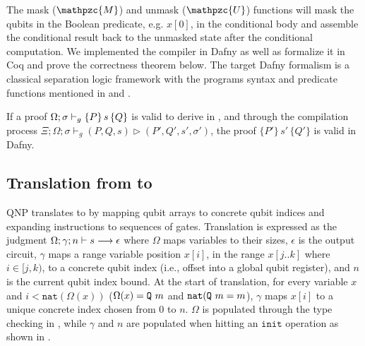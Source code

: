 The mask ($\mathpzc{M}$) and unmask ($\mathpzc{U}$) functions will mask the qubits in the Boolean predicate, e.g. $x[0]$, in the conditional body and assemble the conditional result back to the unmasked state after the conditional computation.
We implemented the compiler in Dafny as well as formalize it in Coq and prove the correctness theorem below. The target Dafny formalism is a classical separation logic framework \cite{separationlogic} with the \qafny programs syntax and predicate functions mentioned in  and .

\begin{theorem}\label{thm:proof-compile-dafny}\rm 
If a proof $\Omega;\sigma\vdash_{g}\{P\}\, s \,\{Q\}$ is valid to derive in \qafny, and through the compilation process $\Xi;\Omega;\sigma\vdash_g (P,Q,s) \triangleright (P',Q',s',\sigma')$, the proof $\{P'\} \, s' \,\{Q'\}$ is valid in Dafny.
\end{theorem}

\subsection{Translation from \qafny to \sqir}\label{sec:vqir-compilation}

\newcommand{\tget}{\texttt{get}}
\newcommand{\tstart}{\texttt{start}}
\newcommand{\tfst}{\texttt{fst}}
\newcommand{\tsnd}{\texttt{snd}}
\newcommand{\tucom}[1]{\texttt{ucom}~{#1}}
\newcommand{\tif}{\texttt{if}}
\newcommand{\tthen}{\texttt{then}}
\newcommand{\telse}{\texttt{else}}
\newcommand{\tlet}{\texttt{let}}
\newcommand{\tin}{\texttt{in}}

QNP translates \qafny to \sqir by mapping \qafny qubit arrays to \sqir concrete qubit indices and expanding \qafny instructions to sequences of \sqir gates.
%
%
Translation is expressed as the judgment
$\Omega;\gamma;n\vdash s \longrightarrow \epsilon$ where $\Omega$ maps \qafny variables to their sizes, 
$\epsilon$ is the output \sqir circuit, $\gamma$ maps a \qafny range variable
position $x[i]$, in the range $x[j..k]$ where $i \in [j,k)$, to a \sqir concrete qubit index (i.e., offset into a 
global qubit register), and $n$ is the current qubit index bound.  
At the start of translation, for every
variable $x$ and $i < \texttt{nat}(\Omega(x))$ ($\Omega(x)=\texttt{Q}~m$ and $\texttt{nat}(\texttt{Q}~m=m$), $\gamma$ maps $x[i]$ to a unique
concrete index chosen from 0 to $n$.
$\Omega$ is populated through the \qafny type checking in ,
while $\gamma$ and $n$ are populated when hitting an $\texttt{init}$ operation as shown in .

